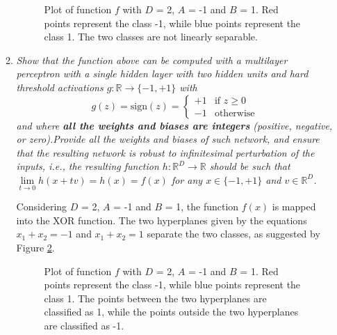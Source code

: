 \documentclass[12pt]{article}
\begin{document}
\begin{enumerate}[leftmargin=\labelsep]
\begin{enumerate}[label=\alph*)]
                    \begin{figure}[H]
                        \centering
                        
                        \caption{Plot of function $f$ with $D$ = 2, $A$ = -1 and $B$ = 1. Red points represent the class -1, while blue points represent the class 1. The two classes are not linearly separable.}
                        \label{fig:xor}
                    \end{figure}

                    \vspace{12pt}


              \item \textit{Show that the function above can be computed with a multilayer perceptron with a single hidden layer with two hidden units and hard threshold activations $g: \mathbb{R} \rightarrow \{-1, +1\}$ with}
                    \begin{equation*}
                        g(z) = \text{sign}(z) = \begin{cases}
                            +1 & \text{if } z \geq 0 \\
                            -1 & \text{otherwise}
                        \end{cases}
                    \end{equation*}
                    \textit{and where \textbf{all the weights and biases are integers} (positive, negative, or zero).Provide all the weights and biases of such network, and ensure that the resulting network is robust to infinitesimal perturbation of the inputs, i.e., the resulting function $h: \mathbb{R}^D \rightarrow \mathbb{R}$ should be such that $\lim\limits_{t \rightarrow 0} h(x + tv) = h(x) = f(x)$ for any $x \in \{-1, +1\}$ and $v \in \mathbb{R}^D$.}

                    \vspace{12pt}

                    Considering $D$ = 2, $A$ = -1 and $B$ = 1, the function $f(x)$ is mapped into the XOR function. The two hyperplanes given by the equations $x_1 + x_2 = -1$ and $x_1 + x_2 = 1$ separate the two classes, as suggested by Figure \ref{fig:xor-separated}.

                    \begin{figure}[H]
                        \centering
                        
                        \caption{Plot of function $f$ with $D$ = 2, $A$ = -1 and $B$ = 1. Red points represent the class -1, while blue points represent the class 1. The points between the two hyperplanes are classified as 1, while the points outside the two hyperplanes are classified as -1.}
                        \label{fig:xor-separated}
                    \end{figure}


\end{enumerate}
\end{enumerate}
\end{document}
